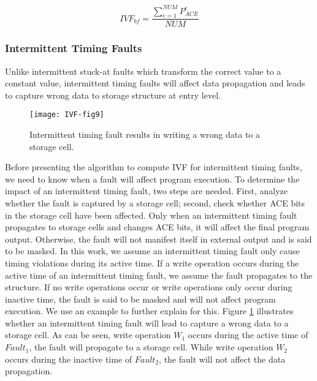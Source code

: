 \begin{equation} \label{eq:IVF-BF}
    IVF_{bf}=\frac{\sum_{e=1}^{NUM}P_{ACE}^{e}}{NUM}
\end{equation}

\subsubsection{Intermittent Timing Faults}
Unlike intermittent stuck-at faults which transform the correct value to a constant value, intermittent timing faults will affect data propagation and leads to capture wrong data to storage structure at entry level.

\begin{figure}[t]
    \centering
    \texttt{[image: IVF-fig9]}\\
    \caption{Intermittent timing fault results in writing a wrong data to a storage cell.}
    \label{fig:IM-timing-fault}
\end{figure}

Before presenting the algorithm to compute IVF for intermittent timing faults, we need to know when a fault will affect program execution. To determine the impact of an intermittent timing fault, two steps are needed. First, analyze whether the fault is captured by a storage cell; second, check whether ACE bits in the storage cell have been affected. Only when an intermittent timing fault propagates to storage cells and changes ACE bits, it will affect the final program output. Otherwise, the fault will not manifest itself in external output and is said to be masked. In this work, we assume an intermittent timing fault only cause timing violations during its active time. If a write operation occurs during the active time of an intermittent timing fault, we assume the fault propagates to the structure. If no write operations occur or write operations only occur during inactive time, the fault is said to be masked and will not affect program execution. We use an example to further explain for this. Figure \ref{fig:IM-timing-fault} illustrates whether an intermittent timing fault will lead to capture a wrong data to a storage cell. As can be seen, write operation $W_1$ occurs during the active time of $Fault_1$, the fault will propagate to a storage cell. While write operation $W_2$ occurs during the inactive time of $Fault_2$, the fault will not affect the data propagation.

